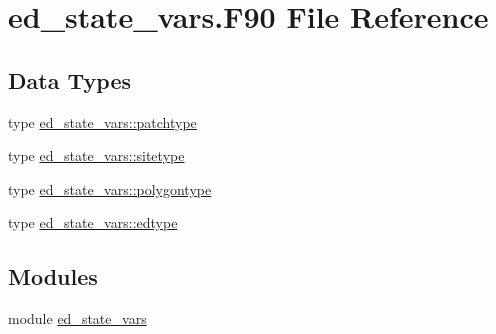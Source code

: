 \hypertarget{ed__state__vars_8_f90}{}\section{ed\+\_\+state\+\_\+vars.\+F90 File Reference}
\label{ed__state__vars_8_f90}
\subsection*{Data Types}
\begin{DoxyCompactItemize}
\item 
type \hyperlink{structed__state__vars_1_1patchtype}{ed\+\_\+state\+\_\+vars\+::patchtype}
\item 
type \hyperlink{structed__state__vars_1_1sitetype}{ed\+\_\+state\+\_\+vars\+::sitetype}
\item 
type \hyperlink{structed__state__vars_1_1polygontype}{ed\+\_\+state\+\_\+vars\+::polygontype}
\item 
type \hyperlink{structed__state__vars_1_1edtype}{ed\+\_\+state\+\_\+vars\+::edtype}
\end{DoxyCompactItemize}
\subsection*{Modules}
\begin{DoxyCompactItemize}
\item 
module \hyperlink{namespaceed__state__vars}{ed\+\_\+state\+\_\+vars}
\end{DoxyCompactItemize}
